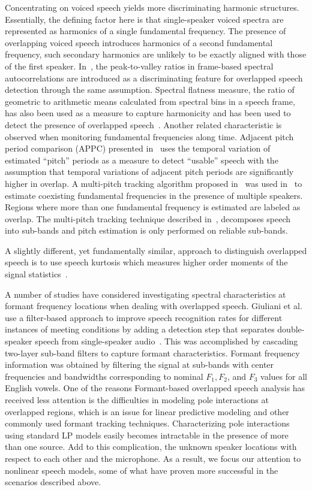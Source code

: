 Concentrating on voiced speech yields more discriminating harmonic structures. 
Essentially, the defining factor here is that single-speaker voiced spectra are represented as harmonics of a single fundamental frequency. 
The presence of overlapping voiced speech introduces harmonics of a second fundamental frequency, such secondary harmonics are unlikely to be exactly aligned with those of the first speaker. 
In~\cite{sapvr_2000}, the peak-to-valley ratios in frame-based spectral autocorrelations are introduced as a discriminating feature for overlapped speech detection through the same assumption. 
Spectral flatness measure, the ratio of geometric to arithmetic means calculated from spectral bins in a speech frame, has also been used as a measure to capture harmonicity and has been used to detect the presence of overlapped speech~\cite{nav_icassp13}. 
Another related characteristic is observed when monitoring fundamental frequencies along time. 
Adjacent pitch period comparison (APPC) presented in~\cite{appc2001} uses the temporal variation of estimated ``pitch'' periods as a measure to detect ``usable'' speech with the assumption that temporal variations of adjacent pitch periods are significantly higher in overlap. 
A multi-pitch tracking algorithm proposed in~\cite{Dwang_03_trans} was used in~\cite{Dwang_03} to estimate coexisting fundamental frequencies in the presence of multiple speakers. 
Regions where more than one fundamental frequency is estimated are labeled as overlap. 
The multi-pitch tracking technique described in~\cite{Dwang_03_trans}, decomposes speech into sub-bands and pitch estimation is only performed on reliable sub-bands. 

A slightly different, yet fundamentally similar, approach to distinguish overlapped speech is to use speech kurtosis which measures higher order moments of the signal statistics~\cite{Wrigley_05}. 


A number of studies have considered investigating spectral characteristics at formant frequency locations when dealing with overlapped speech. 
Giuliani et al. use a filter-based approach to improve speech recognition rates for different instances of meeting conditions by adding a detection step that separates double-speaker speech from single-speaker audio~\cite{giuliani_meeting}. 
This was accomplished by cascading two-layer sub-band filters to capture formant characteristics. 
Formant frequency information was obtained by filtering the signal at sub-bands with center frequencies and bandwidths corresponding to nominal ${F_1, F_2}$, and ${F_3}$ values for all English vowels. 
One of the reasons Formant-based overlapped speech analysis has received less attention is the difficulties in modeling pole interactions at overlapped regions, which is an issue for linear predictive modeling and other commonly used formant tracking techniques. 
Characterizing pole interactions using standard LP models easily becomes intractable in the presence of more than one source. 
Add to this complication, the unknown speaker locations with respect to each other and the microphone. 
As a result, we focus our attention to nonlinear speech models, some of what have proven more successful in the scenarios described above. 

